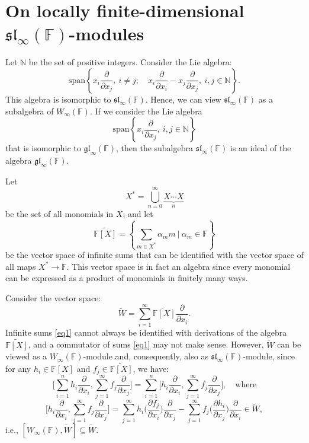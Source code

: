 \documentclass[12pt,a4paper]{amsart}
\theoremstyle{plain}
\begin{document}
	\section{On locally finite-dimensional $\mathfrak{sl}_\infty(\mathbb{F})$-modules}  
	
Let $\mathbb{N}$ be the set of positive integers.	Consider the Lie algebra:
	\[
	\text{span} \left\{ x_i \frac{\partial}{\partial x_j}   , \ i\not= j; \quad x_i \frac{\partial}{\partial x_i} - x_j \frac{\partial}{\partial x_j}, \ i, j \in \mathbb{N} \right\}.
	\]
	This algebra is isomorphic to $\mathfrak{sl}_\infty(\mathbb{F})$. Hence, we can view $\mathfrak{sl}_\infty(\mathbb{F})$ as a subalgebra of $W_\infty(\mathbb{F})$.  If we consider the Lie algebra \[
	\text{span} \left\{ x_i \frac{\partial}{\partial x_j}   ,  \ i, j \in \mathbb{N} \right\}
	\] that is isomorphic to $\mathfrak{gl}_\infty(\mathbb{F})$, then  the subalgebra $\mathfrak{sl}_\infty(\mathbb{F})$  is an ideal of the algebra $\mathfrak{gl}_\infty(\mathbb{F})$.
	
	
	Let $$X^* = \bigcup_{n= 0}^{\infty} \underbrace{X \cdots X}_n$$ be the set of all monomials in $X$; and let
	\[
	\widetilde{\mathbb{F}[X]} = \left\{ \sum_{m \in X^{*}} \alpha_m m \ \Big| \ \alpha_m \in \mathbb{F} \right\}
	\]
	be the vector space of infinite sums that can be identified with the vector space of all maps $X^* \to \mathbb{F}$. This vector space is in fact an algebra since every monomial can be expressed as a product of monomials in finitely many ways.
	
	Consider the vector space:
	\begin{equation}\label{eq1}
		\widetilde{W} = \sum_{i=1}^{\infty} \widetilde{\mathbb{F}[X]} \frac{\partial}{\partial x_i}.
	\end{equation}
	Infinite sums \eqref{eq1} cannot always be identified with derivations of the algebra $\widetilde{\mathbb{F}[X]}$, and a commutator of sums \eqref{eq1}  may not make sense. However, $\widetilde{W}$ can be viewed as a $W_\infty(\mathbb{F})$-module and, consequently, also as $\mathfrak{sl}_\infty(\mathbb{F})$-module, since for any $h_i\in \mathbb{F}[X]$ and $f_j \in \widetilde{\mathbb{F}[X]}$, we have:
	\[
	\Big[\sum_{i=1}^{n} h_i \frac{\partial}{\partial x_i}, \sum_{j=1}^{\infty} f_j \frac{\partial}{\partial x_j}\Big] = \sum_{i=1}^{n}   \Big[h_i \frac{\partial}{\partial x_i }, \sum_{j=1}^{\infty} f_j \frac{\partial }{\partial x_j}\Big] , \quad \text{where}\] 
	\[   \Big[h_i \frac{\partial}{\partial x_i}, \sum_{j=1}^{\infty} f_j \frac{\partial}{\partial x_j}\Big]= \sum_{j=1}^{\infty} h_i \Big(\frac{\partial f_j}{\partial x_i}\Big) \frac{\partial}{\partial x_j} -  \sum_{j=1}^{\infty} f_j \Big(\frac{\partial h_i}{\partial x_j}\Big) \frac{\partial}{\partial x_i} \in  \widetilde{W} ,\] i.e., $[ W_\infty(\mathbb{F}),\widetilde{W}] \subseteq \widetilde{W}.$ 
	
\end{document}
